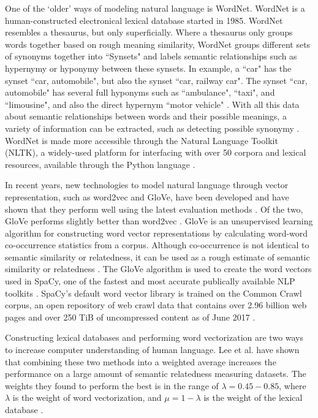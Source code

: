 \documentclass{article}
\begin{document}
One of the `older' ways of modeling natural language is WordNet. WordNet is a human-constructed electronical lexical database started in 1985. WordNet resembles a thesaurus, but only superficially. Where a thesaurus only groups words together based on rough meaning similarity, WordNet groups different sets of synonyms together into ``Synsets" and labels semantic relationships such as hypernymy or hyponymy between these synsets. In example, a ``car" has the synset ``car, automobile", but also the synset ``car, railway car". The synset ``car, automobile" has several full hyponyms such as ``ambulance", ``taxi", and ``limousine", and also the direct hypernym ``motor vehicle" \cite{princeton2010wordnet}. With all this data about semantic relationships between words and their possible meanings, a variety of information can be extracted, such as detecting possible synonymy \cite{kilgarriff2000wordnet}.
WordNet is made more accessible through the Natural Language Toolkit (NLTK), a widely-used platform for interfacing with over 50 corpora and lexical resources, available through the Python language \cite{bird2006nltk}.

In recent years, new technologies to model natural language through vector representation, such as word2vec and GloVe, have been developed \citep{mikolov2013efficient, pennington2014glove} and have shown that they perform well using the latest evaluation methods \citep{schnabel2015evaluation}. Of the two, GloVe performs slightly better than word2vec \citep{lee2016combining}.
GloVe is an unsupervised learning algorithm for constructing word vector representations by calculating word-word co-occurrence statistics from a corpus. Although co-occurrence is not identical to semantic similarity or relatedness, it can be used as a rough estimate of semantic similarity or relatedness \citep{levy2015improving}. The GloVe algorithm is used to create the word vectors used in SpaCy, one of the fastest and most accurate publically available NLP toolkits \citep{choi2015depends}. SpaCy's default word vector library is trained on the Common Crawl corpus, an open repository of web crawl data that contains over 2.96 billion web pages and over 250 TiB of uncompressed content as of June 2017 \citep{nagel2017commoncrawl}.

Constructing lexical databases and performing word vectorization are two ways to increase computer understanding of human language. Lee et al. have shown that combining these two methods into a weighted average increases the performance on a large amount of semantic relatedness measuring datasets. The weights they found to perform the best is in the range of $\lambda = 0.45-0.85$, where $\lambda$ is the weight of word vectorization, and $\mu = 1-\lambda$ is the weight of the lexical database \cite{lee2016combining}.
\end{document}
